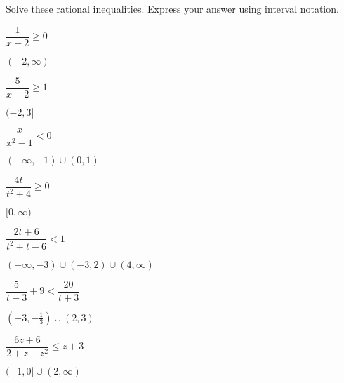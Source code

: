 \documentclass{ximera}
\begin{document}
\begin{problem}  Solve these rational inequalities. Express your answer using interval notation.

\begin{question}
$\dfrac{1}{x + 2} \geq 0$
\begin{solution}
$(-2, \infty)$
\end{solution}

\end{question}

\begin{question}
$\dfrac{5}{x + 2} \geq 1$
\begin{solution}
$(-2, 3]$

\end{solution}

\end{question}

\begin{question}
$\dfrac{x}{x^{2} - 1} <  0$

\begin{solution}
$(-\infty, -1) \cup (0, 1)$
\end{solution}

\end{question}

\begin{question}
$\dfrac{4t}{t^2+4} \geq 0$
\begin{solution}
$[0, \infty)$

\end{solution}

\end{question}

\begin{question}
$\dfrac{2t+6}{t^2+t-6} < 1$
\begin{solution}
$(-\infty, -3) \cup (-3,2) \cup (4, \infty)$
\end{solution}

\end{question}

\begin{question}
$\dfrac{5}{t-3} + 9 < \dfrac{20}{t+3}$

\begin{solution}
$\left(-3, -\frac{1}{3} \right) \cup (2,3)$

\end{solution}

\end{question}

\begin{question}
$\dfrac{6z+6}{2+z-z^2} \leq z+3$
\begin{solution}
$(-1,0] \cup (2, \infty)$
\end{solution}


\end{question}
\end{problem}
\end{document}
